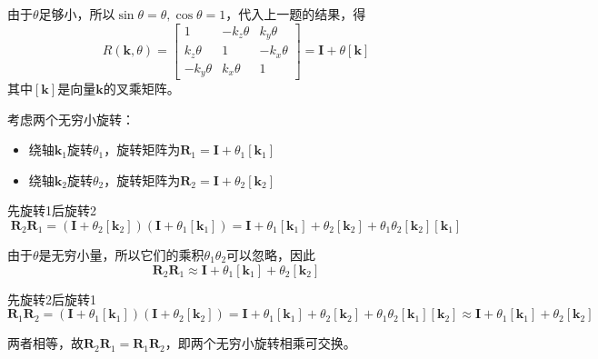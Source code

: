 \documentclass{homework}
\begin{document}
\question 

\begin{sol}
  由于$ \theta $足够小，所以$ \sin\theta = \theta, \cos\theta = 1 $，代入上一题的结果，得
  \[ 
    R(\mathbf{k}, \theta) = 
    \begin{bmatrix}
      1 & -k_z\theta & k_y\theta \\
      k_z\theta & 1 & -k_x\theta \\
      -k_y\theta & k_x\theta & 1
    \end{bmatrix}
    = \mathbf{I} + \theta [\mathbf{k}]
  \]
  其中$ [\mathbf{k}] $是向量$ \mathbf{k} $的叉乘矩阵。

  考虑两个无穷小旋转：
  \begin{itemize}
    \item 绕轴$ \mathbf{k}_1 $旋转$ \theta_1 $，旋转矩阵为$ \mathbf{R}_1 = \mathbf{I} + \theta_1 [\mathbf{k}_1] $
    \item 绕轴$ \mathbf{k}_2 $旋转$ \theta_2 $，旋转矩阵为$ \mathbf{R}_2 = \mathbf{I} + \theta_2 [\mathbf{k}_2] $
  \end{itemize}

  先旋转1后旋转2
  \[ 
    \mathbf{R}_2 \mathbf{R}_1 = (\mathbf{I} + \theta_2 [\mathbf{k}_2])(\mathbf{I} + \theta_1 [\mathbf{k}_1]) = \mathbf{I} + \theta_1 [\mathbf{k}_1] + \theta_2 [\mathbf{k}_2] + \theta_1 \theta_2 [\mathbf{k}_2] [\mathbf{k}_1]
  \]

  由于$ \theta $是无穷小量，所以它们的乘积$ \theta_1 \theta_2 $可以忽略，因此
  \[ 
    \mathbf{R}_2 \mathbf{R}_1 \approx \mathbf{I} + \theta_1 [\mathbf{k}_1] + \theta_2 [\mathbf{k}_2]
  \]

  先旋转2后旋转1
  \[ 
    \mathbf{R}_1 \mathbf{R}_2 = (\mathbf{I} + \theta_1 [\mathbf{k}_1])(\mathbf{I} + \theta_2 [\mathbf{k}_2]) = \mathbf{I} + \theta_1 [\mathbf{k}_1] + \theta_2 [\mathbf{k}_2] + \theta_1 \theta_2 [\mathbf{k}_1] [\mathbf{k}_2] \approx \mathbf{I} + \theta_1 [\mathbf{k}_1] + \theta_2 [\mathbf{k}_2]
  \]

  两者相等，故$ \mathbf{R}_2 \mathbf{R}_1 = \mathbf{R}_1 \mathbf{R}_2 $，即两个无穷小旋转相乘可交换。
  
\end{sol}

\question 
\end{document}
